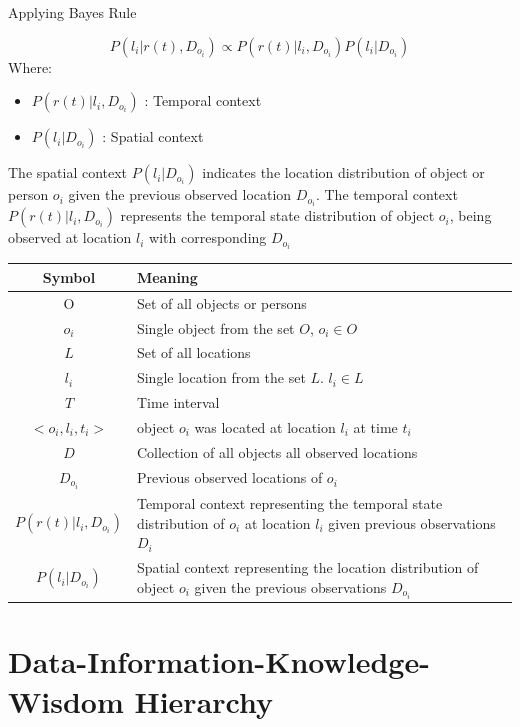     Applying Bayes Rule
    
    \begin{equation}\label{eq:3}
	P( l_i | r(t), D_{o_i}) \propto P(r(t) | l_i, D_{o_i})  P(l_i | D_{o_i})
    \end{equation}
    Where:
    \begin{itemize}[label=]
    \item $P(r(t) | l_i, D_{o_i})$ : Temporal context 
    \item $P(l_i | D_{o_i})$ : Spatial context
    \end{itemize}
    
     The spatial context $P(l_i | D_{o_i})$ indicates the location distribution of object or person $o_i$ given the previous observed location $D_{o_i}$. The temporal context $P(r(t) | l_i, D_{o_i})$ represents the temporal state distribution of object $o_i$, being observed at location $l_i$ with corresponding $D_{o_i}$
    


\begin{tabular}{cp{8cm}}
    \hline
	Symbol & Meaning\\
	\hline
	O & Set of all objects or persons\\
	$o_i$ & Single object from the set $O$, $o_i \in O$ \\
	$L$ & Set of all locations\\
	$l_i$ & Single location from the set $L$. $l_i\in L$\\
    $T$ & Time interval\\
    \hline
	$<o_i,l_i,t_i>$ & object $o_i$ was located at location $l_i$ at time $t_i$\\
	$D$ & Collection of all objects all observed locations\\
	$D_{o_i}$ & Previous observed locations of $o_i$\\ 
    \hline
     $P(r(t) | l_i, D_{o_i})$ &  Temporal context representing the temporal state distribution of $o_i$ at location $l_i$ given previous observations $D_i$\\
     $P(l_i | D_{o_i})$ & Spatial context representing the location distribution of object $o_i$ given the previous observations $D_{o_i}$\\
    \hline
\end{tabular}



\section{Data-Information-Knowledge-Wisdom Hierarchy}


